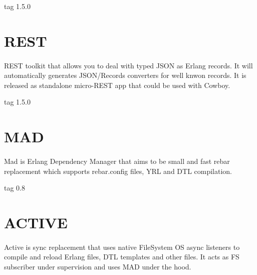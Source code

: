 \documentclass[11pt]{article}
\begin{document}
 tag 1.5.0

\section*{REST}
\paragraph{}
REST toolkit that allows you to deal with typed JSON as Erlang records.
It will automatically generates JSON/Records converters for well knwon records.
It is released as standalone micro-REST app that could be used with Cowboy.

 tag 1.5.0

\section*{MAD}

\paragraph{}
Mad is Erlang Dependency Manager that aims to be small and fast rebar
replacement which supports rebar.config files, YRL and DTL compilation.

 tag 0.8

\section*{ACTIVE}
\paragraph{}
Active is sync replacement that uses native FileSystem OS async
listeners to compile and reload Erlang files, DTL templates and other files.
It acts as FS subscriber under supervision and uses MAD under the hood.
\end{document}
